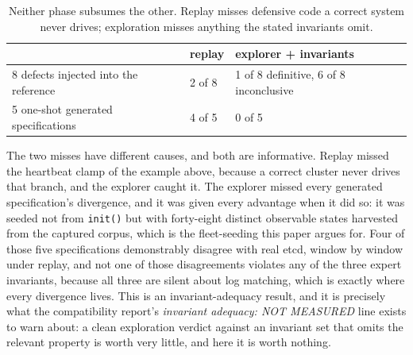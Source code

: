 \documentclass[11pt]{article}
\newcommand{\code}[1]{\texttt{#1}}
\begin{document}
\begin{table}[t]
\centering
\small
\begin{tabular}{@{}p{5.6cm}p{2.6cm}p{5.2cm}@{}}
\toprule
& \textbf{replay} & \textbf{explorer + invariants} \\
\midrule
8 defects injected into the reference & 2 of 8 & 1 of 8 definitive, 6 of 8 inconclusive \\[0.35em]
5 one-shot generated specifications & 4 of 5 & 0 of 5 \\
\bottomrule
\end{tabular}
\caption{Neither phase subsumes the other. Replay misses defensive code a correct
system never drives; exploration misses anything the stated invariants omit.}
\label{tab:phases}
\end{table}

The two misses have different causes, and both are informative. Replay missed the
heartbeat clamp of the example above, because a correct cluster never drives that
branch, and the explorer caught it. The explorer missed every generated
specification's divergence, and it was given every advantage when it did so: it
was seeded not from \code{init()} but with forty-eight distinct observable states
harvested from the captured corpus, which is the fleet-seeding this paper argues
for. Four of those five specifications demonstrably disagree with real etcd, window
by window under replay, and not one of those disagreements violates any of the
three expert invariants, because all three are silent about log matching, which is
exactly where every divergence lives. This is an invariant-adequacy result, and it
is precisely what the compatibility report's \emph{invariant adequacy: NOT
MEASURED} line exists to warn about: a clean exploration verdict against an
invariant set that omits the relevant property is worth very little, and here it
is worth nothing.
\end{document}
